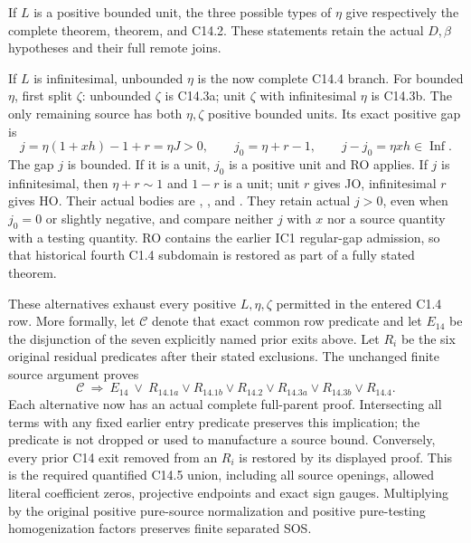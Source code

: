 If $L$ is a positive bounded unit, the three possible types of
$\eta$ give respectively the complete
 theorem,
 theorem,
and C14.2.  These statements retain the actual $D,\beta$ hypotheses
and their full remote joins.

If $L$ is infinitesimal, unbounded $\eta$ is the now complete
C14.4 branch.  For bounded $\eta$, first split $\zeta$:
unbounded $\zeta$ is C14.3a; unit $\zeta$ with infinitesimal
$\eta$ is C14.3b.  The only remaining source has both
$\eta,\zeta$ positive bounded units.  Its exact positive gap is
\[
 j=\eta(1+xh)-1+r=\eta J>0,
 \qquad j_0=\eta+r-1,
 \qquad j-j_0=\eta xh\in\operatorname{Inf}.        \tag{JC6}
\]
The gap $j$ is bounded.  If it is a unit, $j_0$ is a positive
unit and RO applies.  If $j$ is infinitesimal, then
$\eta+r\sim1$ and $1-r$ is a unit; unit $r$ gives JO,
infinitesimal $r$ gives HO.  Their actual bodies are
,
, and
.
They retain actual $j>0$, even when $j_0=0$ or slightly negative,
and compare neither $j$ with $x$ nor a source quantity with a
testing quantity.  RO contains the earlier IC1 regular-gap
admission, so that historical fourth C1.4 subdomain is restored
as part of a fully stated theorem.

These alternatives exhaust every positive $L,\eta,\zeta$ permitted
in the entered C1.4 row.  More formally, let $\mathcal C$ denote
that exact common row predicate and let $E_{14}$ be the disjunction
of the seven explicitly named prior exits above.  Let $R_i$ be the
six original residual predicates after their stated exclusions.
The unchanged finite source argument proves
\[
 \mathcal C\ \Longrightarrow\ E_{14}\ \lor\
 R_{14.1a}\lor R_{14.1b}\lor R_{14.2}\lor
 R_{14.3a}\lor R_{14.3b}\lor R_{14.4}.              \tag{JC7}
\]
Each alternative now has an actual complete full-parent proof.
Intersecting all terms with any fixed earlier entry predicate
preserves this implication; the predicate is not dropped or used
to manufacture a source bound.  Conversely, every prior C14 exit
removed from an $R_i$ is restored by its displayed proof.  This is
the required quantified C14.5 union, including all source openings,
allowed literal coefficient zeros, projective endpoints and exact
sign gauges.  Multiplying by the original positive pure-source
normalization and positive pure-testing homogenization factors
preserves finite separated SOS.

